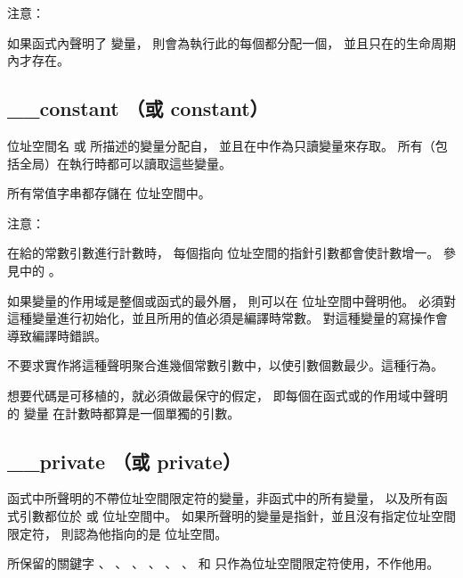 注意：

如果函式內聲明了  變量，
則會為執行此的每個都分配一個，
並且只在的生命周期內才存在。

\subsection{__constant （或 constant）}

位址空間名  或  所描述的變量分配自，
並且在中作為只讀變量來存取。
所有（包括全局）在執行時都可以讀取這些變量。

所有常值字串都存儲在  位址空間中。

注意：

在給的常數引數進行計數時，
每個指向  位址空間的指針引數都會使計數增一。
參見中的 。

如果變量的作用域是整個或函式的最外層，
則可以在  位址空間中聲明他。
必須對這種變量進行初始化，並且所用的值必須是編譯時常數。
對這種變量的寫操作會導致編譯時錯誤。

不要求實作將這種聲明聚合進幾個常數引數中，以使引數個數最少。這種行為。

想要代碼是可移植的，就必須做最保守的假定，
即每個在函式或的作用域中聲明的  變量
在計數時都算是一個單獨的引數。

\subsection{__private （或 private）}

函式中所聲明的不帶位址空間限定符的變量，非函式中的所有變量，
以及所有函式引數都位於  或  位址空間中。
如果所聲明的變量是指針，並且沒有指定位址空間限定符，
則認為他指向的是  位址空間。

所保留的關鍵字
 、 、 、 、
 、 、  和 
 只作為位址空間限定符使用，不作他用。
